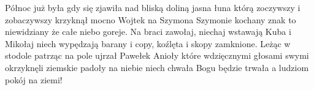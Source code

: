 \beginverse
Północ już była
gdy się zjawiła
nad bliską doliną jasna łuna
którą zoczywszy
i zobaczywszy
krzyknął mocno Wojtek na Szymona
Szymonie kochany
znak to niewidziany
że całe niebo goreje.
\endverse
\beginchorus
Na braci zawołaj, niechaj wstawają
Kuba i Mikołaj niech wypędzają
barany i copy,
koźlęta i skopy
zamknione.
\endchorus
\beginverse
Leżąc w stodole
patrząc na pole
ujrzał Pawełek Anioły
które wdzięcznymi
głosami swymi
okrzyknęli ziemskie padoły
na niebie niech chwała
Bogu będzie trwała
a ludziom pokój na ziemi!
\endverse
\endsong